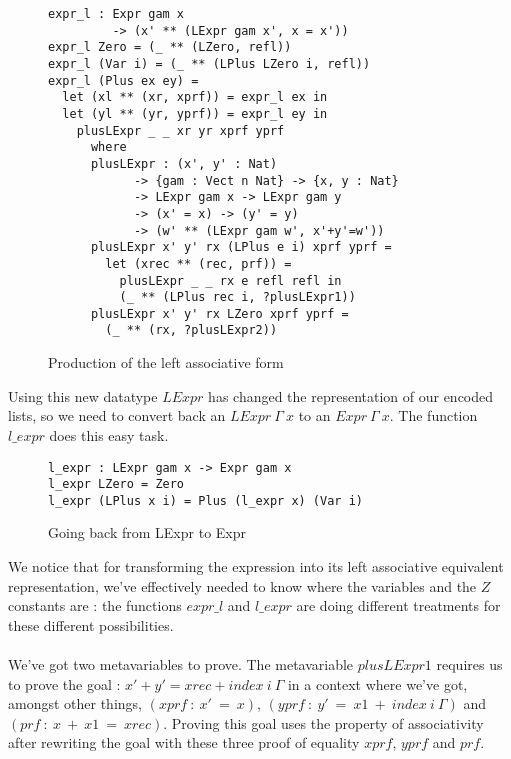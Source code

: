 \begin{figure}[H]
\figrule
\begin{center}
\begin{verbatim}
expr_l : Expr gam x 
         -> (x' ** (LExpr gam x', x = x'))
expr_l Zero = (_ ** (LZero, refl))
expr_l (Var i) = (_ ** (LPlus LZero i, refl))
expr_l (Plus ex ey) = 
  let (xl ** (xr, xprf)) = expr_l ex in
  let (yl ** (yr, yprf)) = expr_l ey in
    plusLExpr _ _ xr yr xprf yprf
      where 
      plusLExpr : (x', y' : Nat)
            -> {gam : Vect n Nat} -> {x, y : Nat} 
            -> LExpr gam x -> LExpr gam y 
            -> (x' = x) -> (y' = y) 
            -> (w' ** (LExpr gam w', x'+y'=w'))
      plusLExpr x' y' rx (LPlus e i) xprf yprf =
        let (xrec ** (rec, prf)) = 
          plusLExpr _ _ rx e refl refl in
          (_ ** (LPlus rec i, ?plusLExpr1))
      plusLExpr x' y' rx LZero xprf yprf =
        (_ ** (rx, ?plusLExpr2))
\end{verbatim}
\end{center}
\caption{Production of the left associative form}
\figrule
\end{figure}


Using this new datatype $LExpr$ has changed the representation of our encoded lists, so we need to convert back an $LExpr\ \Gamma\ x$ to an $Expr\ \Gamma\ x$. The function $l\_expr$ does this easy task.
\begin{figure}[H]
\figrule
\begin{center}
\begin{verbatim}
l_expr : LExpr gam x -> Expr gam x
l_expr LZero = Zero
l_expr (LPlus x i) = Plus (l_expr x) (Var i)
\end{verbatim}
\end{center}
\caption{Going back from LExpr to Expr}
\figrule
\end{figure}


We notice that for transforming the expression into its left associative equivalent representation, we've effectively needed to know where the variables and the $Z$ constants are : the functions $expr\_l$ and $l\_expr$ are doing different treatments for these different possibilities. \\
\\
We've got two metavariables to prove. The metavariable $plusLExpr1$ requires us to prove the goal : $x' + y' = xrec + index\ i\ \Gamma$ in a context where we've got, amongst other things,  $(xprf\ :\ x'\ =\ x)$, $(yprf\ :\ y'\ =\ x1\ +\ index\ i\ \Gamma)$ and $(prf\ :\ x\ +\ x1\ =\ xrec)$.
Proving this goal uses the property of associativity after rewriting the goal with these three proof of equality $xprf$, $yprf$ and $prf$.

